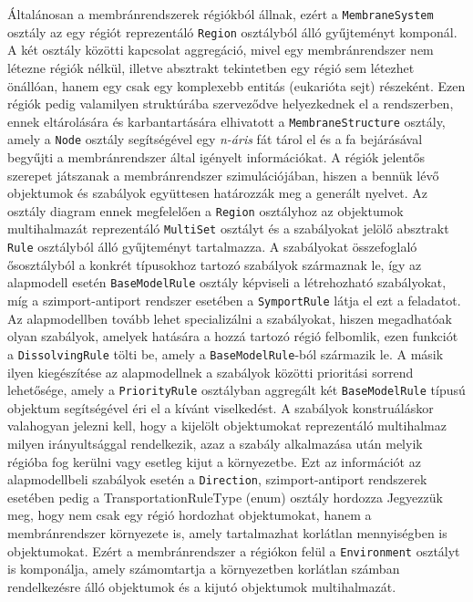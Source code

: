 Általánosan a membránrendszerek régiókból állnak, ezért a \verb|MembraneSystem| osztály az egy régiót reprezentáló \verb|Region| osztályból álló gyűjteményt komponál.  A két osztály közötti kapcsolat aggregáció, mivel egy membránrendszer nem létezne régiók nélkül, illetve absztrakt tekintetben egy régió sem létezhet önállóan, hanem egy csak egy komplexebb entitás (eukarióta sejt) részeként. Ezen régiók pedig valamilyen struktúrába szerveződve helyezkednek el a rendszerben, ennek eltárolására és karbantartására elhivatott a \verb|MembraneStructure| osztály, amely a \verb|Node| osztály segítségével egy \textit{n-áris} fát tárol el és a fa bejárásával begyűjti a membránrendszer által igényelt információkat. A régiók jelentős szerepet játszanak a membránrendszer szimulációjában, hiszen a bennük lévő objektumok és szabályok együttesen határozzák meg a generált nyelvet. Az osztály diagram ennek megfelelően a \verb|Region| osztályhoz  az objektumok multihalmazát reprezentáló \verb|MultiSet| osztályt és a szabályokat jelölő absztrakt \verb|Rule| osztályból álló gyűjteményt tartalmazza.
A szabályokat összefoglaló ősosztályból a konkrét típusokhoz tartozó szabályok származnak le, így az alapmodell esetén \verb|BaseModelRule| osztály képviseli a létrehozható szabályokat, míg a szimport-antiport rendszer esetében a \verb|SymportRule| látja el ezt a feladatot. Az alapmodellben tovább lehet specializálni a szabályokat, hiszen megadhatóak olyan szabályok, amelyek hatására a hozzá tartozó régió felbomlik, ezen funkciót a \verb|DissolvingRule| tölti be, amely a \verb|BaseModelRule|-ból származik le. A másik ilyen kiegészítése az alapmodellnek a szabályok közötti prioritási sorrend lehetősége, amely a \verb|PriorityRule| osztályban aggregált két \verb|BaseModelRule| típusú objektum segítségével éri el a kívánt viselkedést. A szabályok konstruáláskor valahogyan jelezni kell, hogy a kijelölt objektumokat reprezentáló multihalmaz milyen irányultsággal rendelkezik, azaz a szabály alkalmazása után melyik régióba fog kerülni vagy esetleg kijut a környezetbe. Ezt az információt az alapmodellbeli szabályok esetén a \verb|Direction|, szimport-antiport rendszerek esetében pedig a TransportationRuleType  (enum) osztály hordozza
Jegyezzük meg, hogy nem csak egy régió hordozhat objektumokat, hanem a membránrendszer környezete is, amely tartalmazhat korlátlan mennyiségben is objektumokat. Ezért a membránrendszer a régiókon felül a \verb|Environment| osztályt is komponálja, amely számomtartja a környezetben korlátlan számban rendelkezésre álló objektumok és a kijutó objektumok multihalmazát.


